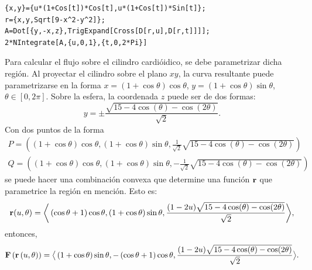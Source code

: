 \begin{parrafonumerado}
\begin{tcolorbox}[title=\bf Instrucción \verb"Mathematica"]\begin{Verbatim}[formatcom=\letraverbatim]
{x,y}={u*(1+Cos[t])*Cos[t],u*(1+Cos[t])*Sin[t]};
r={x,y,Sqrt[9-x^2-y^2]};
A=Dot[{y,-x,z},TrigExpand[Cross[D[r,u],D[r,t]]]];
2*NIntegrate[A,{u,0,1},{t,0,2*Pi}]
\end{Verbatim}
\end{tcolorbox}

Para calcular el flujo sobre el cilindro cardióidico, se debe parametrizar dicha región.
Al proyectar el cilindro sobre el plano $xy$, la curva resultante puede parametrizarse en la forma
$x=\left( 1+\cos \theta \right) \cos \theta $, $y=\left( 1+\cos \theta\right) \sin \theta $, $\theta \in [0,2\pi]$.
Sobre la esfera, la coordenada $z$ puede ser de dos formas:
\[y = \pm \frac{\sqrt{15-4\cos(\theta)-\cos(2\theta)}}{\sqrt{2}}.\]
Con dos puntos de la forma
\begin{gather*}
P=\left(\left( 1+\cos \theta \right) \cos \theta, \left( 1+\cos \theta \right) \sin \theta,\frac{1}{\sqrt{2}}\sqrt{15-4\cos(\theta)-\cos(2\theta)} \right)\\
Q=\left(\left( 1+\cos \theta \right)\cos\theta,\left(1+\cos\theta\right)\sin\theta,-\frac{1}{\sqrt{2}}\sqrt{15-4\cos(\theta)-\cos(2\theta)} \right)
\end{gather*}
se puede hacer una combinación convexa que determine una función ${\bf r}$ que parametrice la región en mención. Esto es:
\begin{gather*}
{\bf r}(u,\theta ) =\bigg \langle \left( \cos \theta +1\right) \cos \theta,\linebreak
(1+\cos\theta) \sin \theta, \frac{(1-2u)\sqrt{15-4\cos(\theta) -\cos(2\theta)}}{\sqrt{2}}\bigg\rangle,
\end{gather*}
entonces,
\begin{gather*}
{\bf F}\left({\bf r}\left(u,\theta \right) \right)  \linebreak
=\big \langle \left( 1+\cos \theta \right) \sin \theta , -\left( \cos \theta +1\right) \cos \theta ,\frac{(1-2u)\sqrt{15-4\cos(\theta)-\cos(2\theta)}}{\sqrt{2}} \big \rangle.
\end{gather*}


\end{parrafonumerado}
